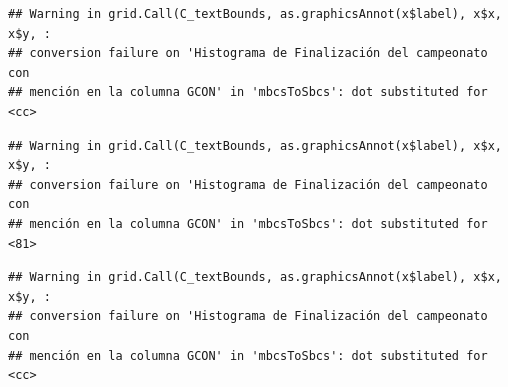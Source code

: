 \documentclass[]{article}
\newenvironment{Shaded}{\begin{snugshade}}{\end{snugshade}}
\newcommand{\CommentTok}[1]{\textcolor[rgb]{0.56,0.35,0.01}{\textit{#1}}}
\newcommand{\DataTypeTok}[1]{\textcolor[rgb]{0.13,0.29,0.53}{#1}}
\newcommand{\DecValTok}[1]{\textcolor[rgb]{0.00,0.00,0.81}{#1}}
\newcommand{\KeywordTok}[1]{\textcolor[rgb]{0.13,0.29,0.53}{\textbf{#1}}}
\newcommand{\NormalTok}[1]{#1}
\newcommand{\OperatorTok}[1]{\textcolor[rgb]{0.81,0.36,0.00}{\textbf{#1}}}
\newcommand{\StringTok}[1]{\textcolor[rgb]{0.31,0.60,0.02}{#1}}
\begin{document}
\begin{Shaded}
\end{Shaded}

\begin{verbatim}
## Warning in grid.Call(C_textBounds, as.graphicsAnnot(x$label), x$x, x$y, :
## conversion failure on 'Histograma de Finalización del campeonato con
## mención en la columna GCON' in 'mbcsToSbcs': dot substituted for <cc>
\end{verbatim}

\begin{verbatim}
## Warning in grid.Call(C_textBounds, as.graphicsAnnot(x$label), x$x, x$y, :
## conversion failure on 'Histograma de Finalización del campeonato con
## mención en la columna GCON' in 'mbcsToSbcs': dot substituted for <81>
\end{verbatim}

\begin{verbatim}
## Warning in grid.Call(C_textBounds, as.graphicsAnnot(x$label), x$x, x$y, :
## conversion failure on 'Histograma de Finalización del campeonato con
## mención en la columna GCON' in 'mbcsToSbcs': dot substituted for <cc>
\end{verbatim}
\end{document}
